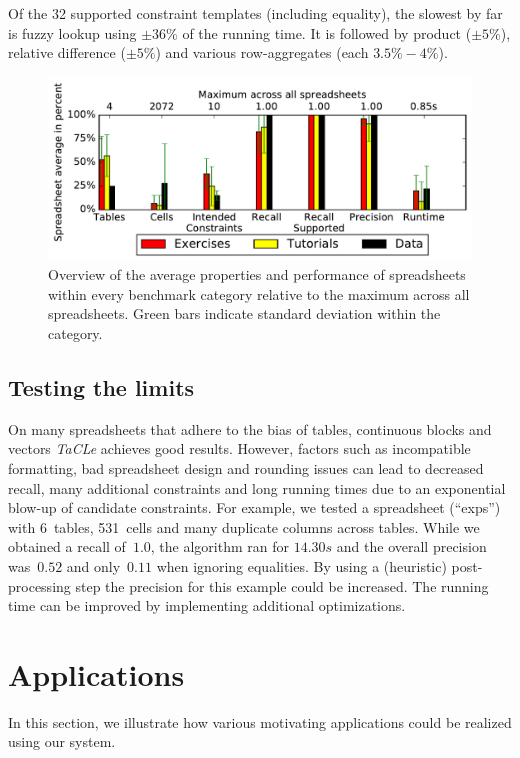 \documentclass{IEEEtran}
\newcommand{\format}[1]{\textit{#1}\xspace}
\newcommand{\sname}{\format{TaCLe}}
\theoremstyle{definition}
\begin{document}
Of the 32 supported constraint templates (including equality), the slowest by far is fuzzy lookup using $\pm 36\%$ of the running time.
It is followed by product ($\pm 5\%$), relative difference ($\pm 5\%$) and various row-aggregates (each $3.5\% - 4\%$).

\begin{figure}[t]
  \centering
  \includegraphics[width=1\linewidth]{figures/comparison.pdf}
  \caption{Overview of the average properties and performance of spreadsheets within every benchmark category relative to the maximum across all spreadsheets.
  Green bars indicate standard deviation within the category.}
  \label{fig:comparison}
\end{figure}

\subsection{Testing the limits}
On many spreadsheets that adhere to the bias of tables, continuous blocks and vectors \sname achieves good results.
However, factors such as incompatible formatting, bad spreadsheet design and rounding issues can lead to decreased recall, many additional constraints and long running times due to an exponential blow-up of candidate constraints.
For example, we tested a spreadsheet (``exps'') with 6~tables, 531~cells and many duplicate columns across tables.
While we obtained a recall of~$1.0$, the algorithm ran for $14.30s$ and the overall precision was~$0.52$ and only~$0.11$ when ignoring equalities.
By using a (heuristic) post-processing step the precision for this example could be increased.
The running time can be improved by implementing additional optimizations.






\section{Applications}\label{sec:applications}
In this section, we illustrate how various motivating applications could be realized using our system.
\end{document}
